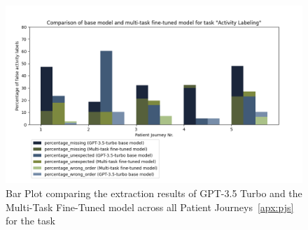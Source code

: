 \begin{figure}
    \centering
    \includegraphics[width=\textwidth]{bachelor_thesis/images/activities_all.png}
    \caption{Bar Plot comparing the extraction results of GPT-3.5 Turbo and the Multi-Task Fine-Tuned model across all Patient Journeys~\ref{apx:pjs} for the task } 
    \label{fig:eval_activities_bar}
\end{figure}

